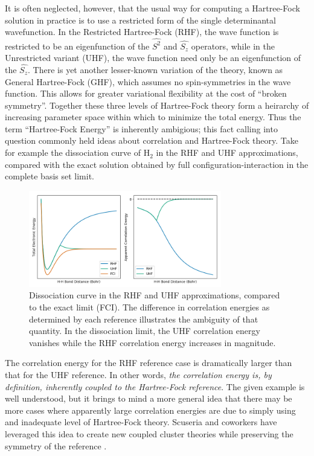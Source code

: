 \documentclass{revtex4}
\begin{document}
      It is often neglected, however, that the usual way for computing a Hartree-Fock solution in 
      practice
    is to use a restricted form of the single determinantal wavefunction. In the Restricted 
    Hartree-Fock (RHF), the wave function is restricted to be an eigenfunction of the $\hat{S^2}$ 
    and $\hat{S_z}$ 
    operators, while in the Unrestricted variant (UHF), the wave function need only be an 
    eigenfunction 
    of the $\hat{S_z}$. There is yet another lesser-known variation of the theory, known as General 
    Hartree-Fock (GHF), which assumes no spin-symmetries in the wave function. This allows for 
    greater
    variational flexibility at the cost of ``broken symmetry''. Together these three levels of 
    Hartree-Fock theory form a heirarchy of increasing parameter space within which to minimize the 
    total energy. Thus the term ``Hartree-Fock Energy'' is inherently ambigious; this fact calling 
    into question commonly held ideas about correlation and Hartree-Fock theory. Take for example 
    the dissociation curve of H$_2$ in the RHF and UHF approximations, compared with the exact 
    solution obtained by full configuration-interaction in the complete basis set limit. 
    
    \begin{figure}[H]
      \centering
      \includegraphics[width=0.75\textwidth]{../figures/H2_curves.png}
      \caption{Dissociation curve in the RHF and UHF approximations, compared to the 
               exact limit (FCI). The difference in correlation energies as determined by 
               each reference illustrates the ambiguity of that quantity. In the             
               dissociation limit, the UHF correlation energy vanishes while the RHF
               correlation energy increases in magnitude.}
      \label{h2diss}
    \end{figure}
    
    The correlation energy for the RHF reference case is dramatically larger than that for the UHF 
    reference. In other words, \emph{the correlation energy is, by definition, inherently coupled 
    to the 
    Hartree-Fock reference}. The given example is well understood, but it brings to mind a more 
    general idea that there may be more cases where apparently large correlation energies are due 
    to simply 
    using and inadequate level of Hartree-Fock theory. Scuseria and coworkers have leveraged this 
    idea to create new coupled cluster theories while preserving the symmetry of the reference 
    \cite{Gomez2016}. 
    
\end{document}
